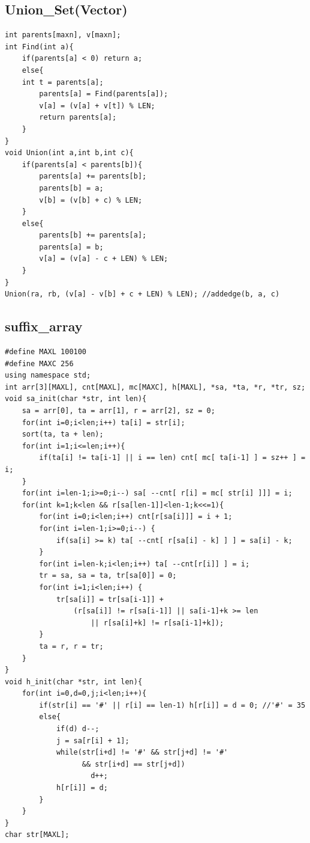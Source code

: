 \documentclass[twocolumn]{article}
\begin{document}
\begin{twocolumn}
\subsection{Union\_Set(Vector)}
\begin{lstlisting}[language={[ANSI]C}]
int parents[maxn], v[maxn];
int Find(int a){
    if(parents[a] < 0) return a;
    else{
	int t = parents[a];
        parents[a] = Find(parents[a]);
        v[a] = (v[a] + v[t]) % LEN;
        return parents[a];
    }
}
void Union(int a,int b,int c){
    if(parents[a] < parents[b]){
        parents[a] += parents[b];
        parents[b] = a;
        v[b] = (v[b] + c) % LEN;
    }
    else{
        parents[b] += parents[a];
        parents[a] = b;
        v[a] = (v[a] - c + LEN) % LEN;
    }
}
Union(ra, rb, (v[a] - v[b] + c + LEN) % LEN); //addedge(b, a, c)
\end{lstlisting}


\subsection{suffix\_array}
\begin{lstlisting}[language={[ANSI]C}]
#define MAXL 100100
#define MAXC 256
using namespace std;
int arr[3][MAXL], cnt[MAXL], mc[MAXC], h[MAXL], *sa, *ta, *r, *tr, sz;
void sa_init(char *str, int len){
    sa = arr[0], ta = arr[1], r = arr[2], sz = 0;
    for(int i=0;i<len;i++) ta[i] = str[i];
    sort(ta, ta + len);
    for(int i=1;i<=len;i++){
        if(ta[i] != ta[i-1] || i == len) cnt[ mc[ ta[i-1] ] = sz++ ] = i;
    }
    for(int i=len-1;i>=0;i--) sa[ --cnt[ r[i] = mc[ str[i] ]]] = i;
    for(int k=1;k<len && r[sa[len-1]]<len-1;k<<=1){
        for(int i=0;i<len;i++) cnt[r[sa[i]]] = i + 1;
        for(int i=len-1;i>=0;i--) {
            if(sa[i] >= k) ta[ --cnt[ r[sa[i] - k] ] ] = sa[i] - k;
        }
        for(int i=len-k;i<len;i++) ta[ --cnt[r[i]] ] = i;
        tr = sa, sa = ta, tr[sa[0]] = 0;
        for(int i=1;i<len;i++) {
            tr[sa[i]] = tr[sa[i-1]] +
                (r[sa[i]] != r[sa[i-1]] || sa[i-1]+k >= len
                    || r[sa[i]+k] != r[sa[i-1]+k]);
        }
        ta = r, r = tr;
    }
}
void h_init(char *str, int len){
    for(int i=0,d=0,j;i<len;i++){
        if(str[i] == '#' || r[i] == len-1) h[r[i]] = d = 0; //'#' = 35
        else{
            if(d) d--;
            j = sa[r[i] + 1];
            while(str[i+d] != '#' && str[j+d] != '#'
                  && str[i+d] == str[j+d])
                    d++;
            h[r[i]] = d;
        }
    }
}
char str[MAXL];
\end{lstlisting}


\end{twocolumn}
\end{document}
